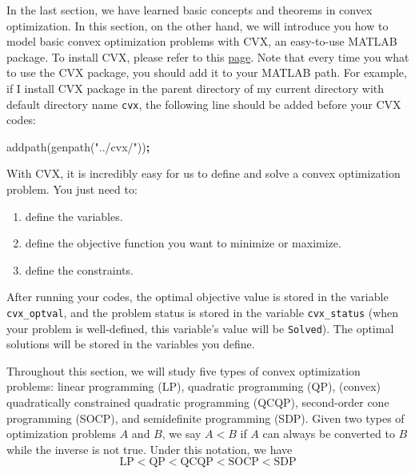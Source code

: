 \documentclass[
]{book}
\newenvironment{Shaded}{\begin{snugshade}}{\end{snugshade}}
\newcommand{\NormalTok}[1]{#1}
\newcommand{\OperatorTok}[1]{\textcolor[rgb]{0.81,0.36,0.00}{\textbf{#1}}}
\newcommand{\StringTok}[1]{\textcolor[rgb]{0.31,0.60,0.02}{#1}}
\newcommand{\VariableTok}[1]{\textcolor[rgb]{0.00,0.00,0.00}{#1}}
\theoremstyle{definition}
\theoremstyle{definition}
\theoremstyle{definition}
\theoremstyle{definition}
\theoremstyle{remark}
\begin{document}
In the last section, we have learned basic concepts and theorems in convex optimization. In this section, on the other hand, we will introduce you how to model basic convex optimization problems with CVX, an easy-to-use MATLAB package. To install CVX, please refer to this \href{http://cvxr.com/cvx/doc/install.html}{page}. Note that every time you what to use the CVX package, you should add it to your MATLAB path. For example, if I install CVX package in the parent directory of my current directory with default directory name \texttt{cvx}, the following line should be added before your CVX codes:

\begin{Shaded}
\begin{Highlighting}[]
\VariableTok{addpath}\NormalTok{(}\VariableTok{genpath}\NormalTok{(}\StringTok{"../cvx/"}\NormalTok{))}\OperatorTok{;}
\end{Highlighting}
\end{Shaded}

With CVX, it is incredibly easy for us to define and solve a convex optimization problem. You just need to:

\begin{enumerate}
\def\labelenumi{\arabic{enumi}.}
\item
  define the variables.
\item
  define the objective function you want to minimize or maximize.
\item
  define the constraints.
\end{enumerate}

After running your codes, the optimal objective value is stored in the variable \texttt{cvx\_optval}, and the problem status is stored in the variable \texttt{cvx\_status} (when your problem is well-defined, this variable's value will be \texttt{Solved}). The optimal solutions will be stored in the variables you define.

Throughout this section, we will study five types of convex optimization problems: linear programming (LP), quadratic programming (QP), (convex) quadratically constrained quadratic programming (QCQP), second-order cone programming (SOCP), and semidefinite programming (SDP). Given two types of optimization problems \(A\) and \(B\), we say \(A < B\) if \(A\) can always be converted to \(B\) while the inverse is not true. Under this notation, we have
\begin{equation*}
   \text{LP} < \text{QP} < \text{QCQP} < \text{SOCP} < \text{SDP}
\end{equation*}
\end{document}
